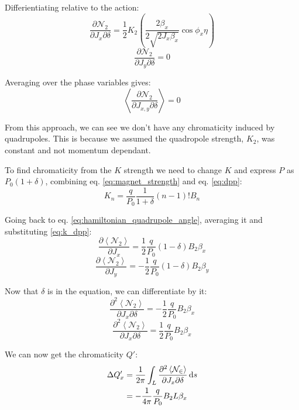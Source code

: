 \documentclass[openright,twoside,headsepline,bibliography=totoc]{scrbook}
\begin{document}
Differientiating relative to the action:
\begin{equation}\frac{\partial \mathcal{N_2}}{\partial J_x \partial \delta} =  \frac{1}{2} K_2 \left (\frac{2 \beta_x}{2 \sqrt{2 J_x \beta_x}} \cos \phi_x \eta \right) \end{equation}
\begin{equation}\frac{\partial \mathcal{N_2}}{\partial J_y \partial \delta} = 0\end{equation}

Averaging over the phase variables gives:
\begin{equation}\left< \frac{\partial \mathcal{N_2}}{\partial J_{x,y} \partial \delta} \right> = 0\end{equation}

From this approach, we can see we don't have any chromaticity induced by
quadrupoles. This is because we assumed the quadropole strength,
\(K_2\), was constant and not momentum dependant.

To find chromaticity from the \(K\) strength we need to change \(K\) and
express \(P\) as \(P_0(1 + \delta)\), combining eq.
\ref{eq:magnet_strength} and eq. \ref{eq:dpp}:
\begin{equation}K_n = \frac{q}{P_0} \frac{1}{1 + \delta} (n - 1)! B_n\label{eq:k_dpp}\end{equation}

Going back to eq. \ref{eq:hamiltonian_quadrupole_angle}, averaging it
and substituting \ref{eq:k_dpp}:
\begin{equation}\frac{\partial \left< \mathcal{N_2} \right>}{\partial J_x} = \frac{1}{2} \frac{q}{P_0} (1 - \delta) B_2 \beta_x\end{equation}
\begin{equation}\frac{\partial \left< \mathcal{N_2} \right>}{\partial J_y} = - \frac{1}{2} \frac{q}{P_0} (1 - \delta) B_2 \beta_y\end{equation}

Now that \(\delta\) is in the equation, we can differentiate by it:
\begin{equation}\frac{\partial^2 \left< \mathcal{N_2} \right>}{\partial J_x \partial \delta}  = - \frac{1}{2} \frac{q}{P_0} B_2 \beta_x\end{equation}
\begin{equation}\frac{\partial^2 \left< \mathcal{N_2} \right>}{\partial J_x \partial \delta}  = \frac{1}{2} \frac{q}{P_0} B_2 \beta_x\end{equation}

We can now get the chromaticity \(Q'\): \begin{equation}\begin{aligned}
\Delta Q'_x &= \frac{1}{2\pi} \int_L \frac{\partial^2 \left< \mathcal{N_2} \right> }{\partial J_x \partial \delta} \mathop{}\!\mathrm{d} s \\
  & = - \frac{1}{4 \pi} \frac{q}{P_0} B_2 L \beta_x
\end{aligned}\end{equation}
\end{document}
